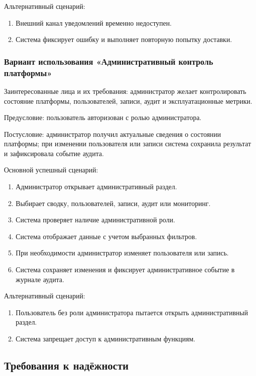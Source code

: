 Альтернативный сценарий:
\begin{enumerate}
\item Внешний канал уведомлений временно недоступен.
\item Система фиксирует ошибку и выполняет повторную попытку доставки.
\end{enumerate}

\subsubsection{Вариант использования «Административный контроль платформы»}

Заинтересованные лица и их требования: администратор желает контролировать состояние платформы, пользователей, записи, аудит и эксплуатационные метрики.

Предусловие: пользователь авторизован с ролью администратора.

Постусловие: администратор получил актуальные сведения о состоянии платформы; при изменении пользователя или записи система сохранила результат и зафиксировала событие аудита.

Основной успешный сценарий:
\begin{enumerate}
\item Администратор открывает административный раздел.
\item Выбирает сводку, пользователей, записи, аудит или мониторинг.
\item Система проверяет наличие административной роли.
\item Система отображает данные с учетом выбранных фильтров.
\item При необходимости администратор изменяет пользователя или запись.
\item Система сохраняет изменения и фиксирует административное событие в журнале аудита.
\end{enumerate}

Альтернативный сценарий:
\begin{enumerate}
\item Пользователь без роли администратора пытается открыть административный раздел.
\item Система запрещает доступ к административным функциям.
\end{enumerate}

\subsection{Требования к надёжности}

